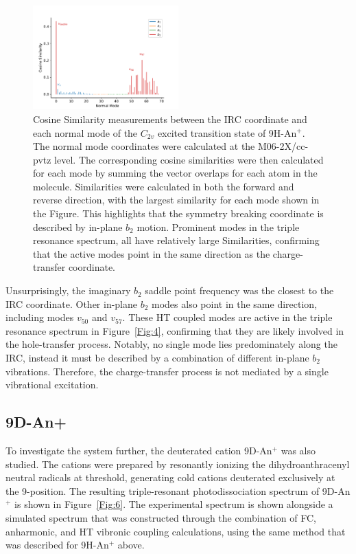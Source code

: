 \documentclass[journal=jpcafh,manuscript=article,layout=onecolumn, 12pt]{achemso}
\begin{document}
\begin{figure} [h]
	\includegraphics[width=0.5\textwidth]{figures/Figure5}
	\caption{Cosine Similarity measurements between the IRC coordinate and each normal mode of the $C_{2v}$ excited transition state of 9H-An$^+$. The normal mode coordinates were calculated at the M06-2X/cc-pvtz level. The corresponding cosine similarities were then calculated for each mode by summing the vector overlaps for each atom in the molecule. Similarities were calculated in both the forward and reverse direction, with the largest similarity for each mode shown in the Figure. This highlights that the symmetry breaking coordinate is described by in-plane $b_2$ motion. Prominent modes in the triple resonance spectrum, all have relatively large Similarities, confirming that the active modes point in the same direction as the charge-transfer coordinate.}
	\label{Fig:5}
\end{figure}

Unsurprisingly, the imaginary $b_2$ saddle point frequency was the closest to the IRC coordinate. Other in-plane $b_2$ modes also point in the same direction, including modes $v_{50}$ and $v_{57}$. These HT coupled modes are active in the triple resonance spectrum in Figure~\ref{Fig:4}, confirming that they are likely involved in the hole-transfer process. %
Notably, no single mode lies predominately along the IRC, instead it must be described by a combination of different in-plane $b_2$ vibrations. Therefore, the charge-transfer process is not mediated by a single vibrational excitation.

\subsection{9D-An+}
To investigate the system further, the deuterated cation 9D-An$^+$ was also studied. The cations were prepared by resonantly ionizing the dihydroanthracenyl neutral radicals at threshold, generating cold cations deuterated exclusively at the 9-position. The resulting triple-resonant photodissociation spectrum of 9D-An$^+$ is shown in Figure~\ref{Fig:6}. The experimental spectrum is shown alongside a simulated spectrum that was constructed through the combination of FC, anharmonic, and HT vibronic coupling calculations, using the same method that was described for 9H-An$^+$ above.
\end{document}
